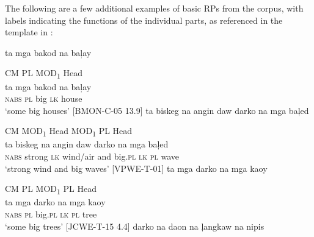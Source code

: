 The following are a few additional examples of basic RPs from the corpus, with labels indicating the functions of the individual parts, as referenced in the template in :

\ea
\label{bkm:Ref363459525}
ta  mga  bakod  na  baļay \\\smallskip

CM  \hspace{6pt} PL \hspace{4pt}  MOD\textsubscript{1} \quad    Head \\
\gll ta  mga  bakod  na  baļay\footnotemark{} \\
\textsc{nabs}  \textsc{pl}  big  \textsc{lk}  house \\
\glt ‘some big houses’ [BMON-C-05 13.9]
\z
\ea
\label{bkm:Ref414967349}
ta  biskeg  na  angin  daw  darko  na  mga  baļed \\\smallskip

CM  \hspace{4pt} MOD\textsubscript{1} \hspace{12pt}  Head \hspace{32pt}   MOD\textsubscript{1} 
\hspace{10pt}   PL  \hspace{2pt} Head \\
\gll ta  biskeg  na  angin  daw  darko  na  mga  baļed \\
\textsc{nabs}  strong  \textsc{lk}  wind/air  and  big.\textsc{pl}  \textsc{lk}  \textsc{pl}  wave \\
\glt ‘strong wind and big waves’ [VPWE-T-01]
\z
\ea
\label{bkm:Ref414967351}
ta  mga  darko  na   mga  kaoy \\\smallskip

CM \hspace{6pt} PL \hspace{4pt} MOD\textsubscript{1} \hspace{8pt}  PL \hspace{4pt} Head \\
\gll ta  mga  darko  na   mga  kaoy \\
\textsc{nabs}  \textsc{pl}  big.\textsc{pl}  \textsc{lk}  \textsc{pl}  tree \\
\glt ‘some big trees’ [JCWE-T-15 4.4]
\z
\ea
\label{bkm:Ref363459636}
\emptyset{}  darko  na  daon  na  ļangkaw  na  nipis \\\smallskip

